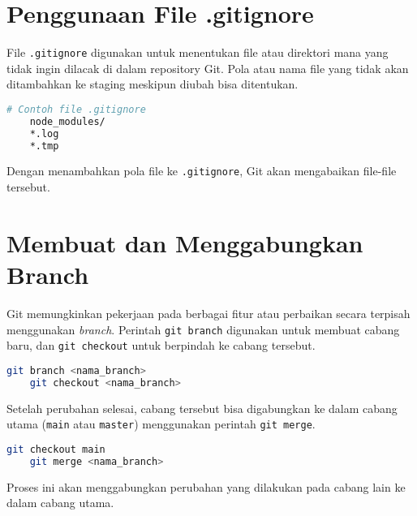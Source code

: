 \section{Penggunaan File .gitignore}
File \texttt{.gitignore} digunakan untuk menentukan file atau direktori mana yang tidak ingin dilacak di dalam repository Git. Pola atau nama file yang tidak akan ditambahkan ke staging meskipun diubah bisa ditentukan.
\begin{lstlisting}[language=bash]
	# Contoh file .gitignore
	node_modules/
	*.log
	*.tmp
\end{lstlisting}
Dengan menambahkan pola file ke \texttt{.gitignore}, Git akan mengabaikan file-file tersebut.

\section{Membuat dan Menggabungkan Branch}
Git memungkinkan pekerjaan pada berbagai fitur atau perbaikan secara terpisah menggunakan \textit{branch}. Perintah \texttt{git branch} digunakan untuk membuat cabang baru, dan \texttt{git checkout} untuk berpindah ke cabang tersebut.
\begin{lstlisting}[language=bash]
	git branch <nama_branch>
	git checkout <nama_branch>
\end{lstlisting}
Setelah perubahan selesai, cabang tersebut bisa digabungkan ke dalam cabang utama (\texttt{main} atau \texttt{master}) menggunakan perintah \texttt{git merge}.
\begin{lstlisting}[language=bash]
	git checkout main
	git merge <nama_branch>
\end{lstlisting}
Proses ini akan menggabungkan perubahan yang dilakukan pada cabang lain ke dalam cabang utama.
